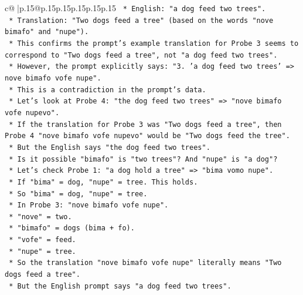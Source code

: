 \documentclass{article}
\begin{document}
{\begin{supertabular}{c@{$\;$}|p{.15\linewidth}@{}p{.15\linewidth}p{.15\linewidth}p{.15\linewidth}p{.15\linewidth}p{.15\linewidth}}
{{{\texttt{                        *   English: "a dog feed two trees".} \\
\texttt{                        *   Translation: "Two dogs feed a tree" (based on the words "nove bimafo" and "nupe").} \\
\texttt{                        *   This confirms the prompt's example translation for Probe 3 seems to correspond to "Two dogs feed a tree", not "a dog feed two trees".} \\
\texttt{                        *   However, the prompt explicitly says: "3. 'a dog feed two trees' => nove bimafo vofe nupe".} \\
\texttt{                        *   This is a contradiction in the prompt's data.} \\
\texttt{                        *   Let's look at Probe 4: "the dog feed two trees" => "nove bimafo vofe nupevo".} \\
\texttt{                        *   If the translation for Probe 3 was "Two dogs feed a tree", then Probe 4 "nove bimafo vofe nupevo" would be "Two dogs feed the tree".} \\
\texttt{                        *   But the English says "the dog feed two trees".} \\
\texttt{                        *   Is it possible "bimafo" is "two trees"? And "nupe" is "a dog"?} \\
\texttt{                        *   Let's check Probe 1: "a dog hold a tree" => "bima vomo nupe".} \\
\texttt{                            *   If "bima" = dog, "nupe" = tree. This holds.} \\
\texttt{                        *   So "bima" = dog, "nupe" = tree.} \\
\texttt{                        *   In Probe 3: "nove bimafo vofe nupe".} \\
\texttt{                            *   "nove" = two.} \\
\texttt{                            *   "bimafo" = dogs (bima + fo).} \\
\texttt{                            *   "vofe" = feed.} \\
\texttt{                            *   "nupe" = tree.} \\
\texttt{                            *   So the translation "nove bimafo vofe nupe" literally means "Two dogs feed a tree".} \\
\texttt{                            *   But the English prompt says "a dog feed two trees".} \\
}}}
\end{supertabular}}
\end{document}
